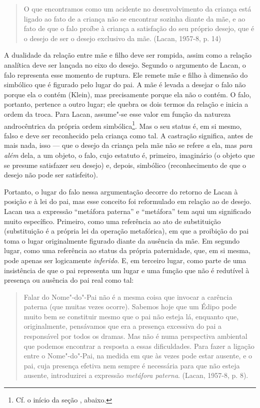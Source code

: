 \begin{quote}
O que encontramos como um acidente no desenvolvimento da criança está
ligado ao fato de a criança não se encontrar sozinha diante da mãe, e ao
fato de que o falo proíbe à criança a satisfação do seu próprio desejo,
que é o desejo de ser o desejo exclusivo da mãe. (Lacan, 1957-8, p. 14)
\end{quote}

A dualidade da relação entre mãe e filho deve ser rompida, assim como a
relação analítica deve ser lançada no eixo do desejo. Segundo o
argumento de Lacan, o falo representa esse momento de ruptura. Ele
remete mãe e filho à dimensão do simbólico que é figurado pelo lugar do
pai. A mãe é levada a desejar o falo não porque ela o contém (Klein),
mas precisamente porque ela não o contém. O falo, portanto, pertence a
outro lugar; ele quebra os dois termos da relação e inicia a ordem da
troca. Para Lacan, assume"-se esse valor em função da natureza
androcêntrica da própria ordem simbólica\footnote{Cf. o início da seção
  , abaixo.}. Mas o seu status é, em si mesmo, falso e deve ser
reconhecido pela criança como tal. A castração significa, antes de mais
nada, isso --- que o desejo da criança pela mãe não se refere \emph{a}
ela, mas \emph{para} \emph{além} dela, a um objeto, o falo, cujo
estatuto é, primeiro, imaginário (o objeto que se presume satisfazer seu
desejo) e, depois, simbólico (reconhecimento de que o desejo não pode
ser satisfeito).

Portanto, o lugar do falo nessa argumentação decorre do retorno de Lacan
à posição e à lei do pai, mas esse conceito foi reformulado em relação
ao de desejo. Lacan usa a expressão ``metáfora paterna'' e ``metáfora''
tem aqui um significado muito específico. Primeiro, como uma referência
ao ato de substituição (substituição é a própria lei da operação
metafórica), em que a proibição do pai toma o lugar originalmente
figurado diante da ausência da mãe. Em segundo lugar, como uma
referência ao status da própria paternidade, que, em si mesma, pode
apenas ser logicamente \emph{inferido}. E, em terceiro lugar, como parte
de uma insistência de que o pai representa um lugar e uma função que não
é redutível à presença ou ausência do pai real como tal:

\begin{quote}
Falar do Nome"-do"-Pai não é a mesma coisa que invocar a carência paterna
(que muitas vezes ocorre). Sabemos hoje que um Édipo pode muito bem se
constituir mesmo que o pai não esteja lá, enquanto que, originalmente,
pensávamos que era a presença excessiva do pai a responsável por todos
os dramas. Mas não é numa perspectiva ambiental que podemos encontrar a
resposta a essas dificuldades. Para fazer a ligação entre o Nome"-do"-Pai,
na medida em que às vezes pode estar ausente, e o pai, cuja presença
efetiva nem sempre é necessária para que não esteja ausente,
introduzirei a expressão \emph{metáfora paterna}. (Lacan, 1957-8, p. 8).
\end{quote}


